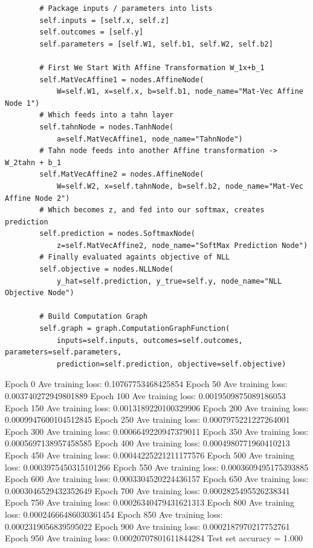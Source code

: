 \documentclass{article}
\theoremstyle{plain}
\theoremstyle{definition}
\begin{document}
\begin{enumerate}
\begin{verbatim}
        # Package inputs / parameters into lists
        self.inputs = [self.x, self.z]
        self.outcomes = [self.y]
        self.parameters = [self.W1, self.b1, self.W2, self.b2]

        # First We Start With Affine Transformation W_1x+b_1
        self.MatVecAffine1 = nodes.AffineNode(
            W=self.W1, x=self.x, b=self.b1, node_name="Mat-Vec Affine Node 1")
        # Which feeds into a tahn layer
        self.tahnNode = nodes.TanhNode(
            a=self.MatVecAffine1, node_name="TahnNode")
        # Tahn node feeds into another Affine transformation -> W_2tahn + b_1
        self.MatVecAffine2 = nodes.AffineNode(
            W=self.W2, x=self.tahnNode, b=self.b2, node_name="Mat-Vec Affine Node 2")
        # Which becomes z, and fed into our softmax, creates prediction
        self.prediction = nodes.SoftmaxNode(
            z=self.MatVecAffine2, node_name="SoftMax Prediction Node")
        # Finally evaluated againts objective of NLL
        self.objective = nodes.NLLNode(
            y_hat=self.prediction, y_true=self.y, node_name="NLL Objective Node")

        # Build Computation Graph
        self.graph = graph.ComputationGraphFunction(
            inputs=self.inputs, outcomes=self.outcomes, parameters=self.parameters, 
            prediction=self.prediction, objective=self.objective)
\end{verbatim}


Epoch  0  Ave training loss:  0.10767753468425854
Epoch  50  Ave training loss:  0.003740272949801889
Epoch  100  Ave training loss:  0.0019509875089186053
Epoch  150  Ave training loss:  0.0013189220100329906
Epoch  200  Ave training loss:  0.0009947600104512845
Epoch  250  Ave training loss:  0.0007975221227264001
Epoch  300  Ave training loss:  0.0006649220947379011
Epoch  350  Ave training loss:  0.0005697138957458585
Epoch  400  Ave training loss:  0.0004980771960410213
Epoch  450  Ave training loss:  0.00044225221211177576
Epoch  500  Ave training loss:  0.0003975450315101266
Epoch  550  Ave training loss:  0.0003609495175393885
Epoch  600  Ave training loss:  0.0003304520224436157
Epoch  650  Ave training loss:  0.0003046529432352649
Epoch  700  Ave training loss:  0.0002825495526238341
Epoch  750  Ave training loss:  0.00026340479431621313
Epoch  800  Ave training loss:  0.00024666486030361454
Epoch  850  Ave training loss:  0.0002319056839595022
Epoch  900  Ave training loss:  0.0002187970217752761
Epoch  950  Ave training loss:  0.00020707801611844284
Test set accuracy = 1.000

\setcounter{saveenum}{\value{enumi}}
\end{enumerate}
\end{document}
